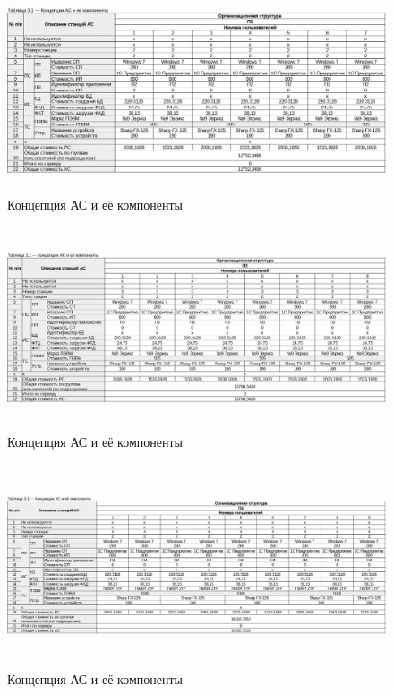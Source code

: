 \documentclass[12pt, a4paper, simple]{eskdtext}
\begin{document}
    \begin{figure}[!hp]
        \centering
        \includegraphics[height=6cm]
            {_docs/Таблица3-1КонцепцияАСИЕеКомпоненты__лаб2_П2.jpg}
        \caption{Концепция АС и её компоненты}
    \end{figure}

    \begin{figure}[!hp]
        \centering
        \includegraphics[height=6cm]
            {_docs/Таблица3-1КонцепцияАСИЕеКомпоненты__лаб2_П3.jpg}
        \caption{Концепция АС и её компоненты}
    \end{figure}

    \begin{figure}[!hp]
        \centering
        \includegraphics[height=6cm]
            {_docs/Таблица3-1КонцепцияАСИЕеКомпоненты__лаб2_П4.jpg}
        \caption{Концепция АС и её компоненты}
    \end{figure}
\end{document}
